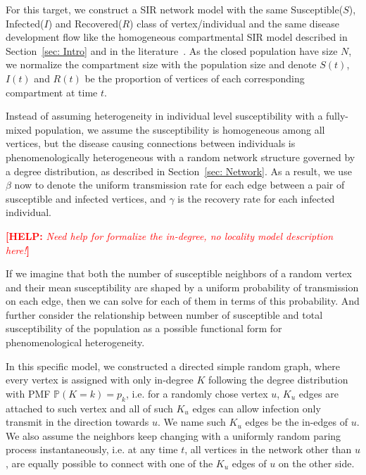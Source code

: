 \documentclass[12pt]{article}
\theoremstyle{plain}
\theoremstyle{definition}
\newcommand{\comment}{\showcomment}
\newcommand{\showcomment}[3]{\textcolor{#1}{\textbf{[#2: }\textsl{#3}\textbf{]}}}
\newcommand{\help}[1]{\comment{red}{HELP}{#1}}
\begin{document}
For this target, we construct a SIR network model with the same Susceptible($S$), Infected($I$) and Recovered($R$) class of vertex/individual and the same disease development flow like the homogeneous compartmental SIR model described in Section~\ref{sec: Intro} and in the literature~\cite{Novozhilov:2008}.
As the closed population have size $N$, we normalize the compartment size with the population size and denote $S(t)$, $I(t)$ and $R(t)$ be the proportion of vertices of each corresponding compartment at time $t$. 

Instead of assuming heterogeneity in individual level susceptibility with a fully-mixed population, we assume the susceptibility is homogeneous among all vertices, but the disease causing connections between individuals is phenomenologically heterogeneous with a random network structure governed by a degree distribution, as described in Section~\ref{sec: Network}.
As a result, we use $\beta$ now to denote the uniform transmission rate for each edge between a pair of susceptible and infected vertices, and $\gamma$ is the recovery rate for each infected individual.

\help{Need help for formalize the in-degree, no locality model description here!}

If we imagine that both the number of susceptible neighbors of a random vertex and their mean susceptibility are shaped by a uniform probability of transmission on each edge, then we can solve for each of them in terms of this probability.
And further consider the relationship between number of susceptible and total susceptibility of the population as a possible functional form for phenomenological heterogeneity.

In this specific model, we constructed a directed simple random graph, where every vertex is assigned with only in-degree $K$ following the degree distribution with PMF $\mathbb{P}(K=k)=p_k$, i.e. for a randomly chose vertex $u$, $K_u$ edges are attached to such vertex and all of such $K_u$ edges can allow infection only transmit in the direction towards $u$.
We name such $K_u$ edges be the in-edges of $u$. 
We also assume the neighbors keep changing with a uniformly random paring process instantaneously, i.e. at any time $t$, all vertices in the network other than $u$, are equally possible to connect with one of the $K_u$ edges of $u$ on the other side.
\end{document}
